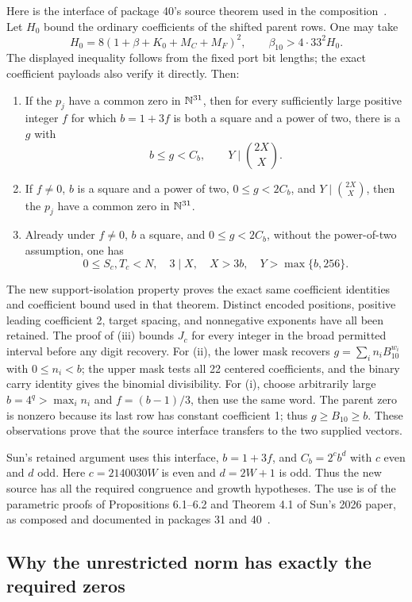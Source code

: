 Here is the interface of package 40's source theorem used in the
composition~\cite{source40}.  Let $H_0$ bound the ordinary coefficients
of the shifted parent rows.  One may take
\[
 H_0=8(1+\beta+K_0+M_C+M_F)^2,
 \qquad \beta_{10}>4\cdot33^2H_0.
\]
The displayed inequality follows from the fixed port bit lengths; the
exact coefficient payloads also verify it directly.  Then:
\begin{enumerate}[label=\textup{(\roman*)}]
\item If the $p_j$ have a common zero in $\mathbb N^{31}$, then for every
sufficiently large positive integer $f$ for which $b=1+3f$ is both a
square and a power of two, there is a $g$ with
\[
 b\leq g<C_b,\qquad Y\mid\binom{2X}{X}.
\]
\item If $f\ne0$, $b$ is a square and a power of two,
$0\leq g<2C_b$, and $Y\mid\binom{2X}{X}$, then the $p_j$ have a
common zero in $\mathbb N^{31}$.
\item Already under $f\ne0$, $b$ a square, and $0\leq g<2C_b$,
without the power-of-two assumption, one has
\[
 0\leq S_c,T_c<N,\quad3\mid X,\quad X>3b,\quad
 Y>\max\{b,256\}.
\]
\end{enumerate}

The new support-isolation property proves the exact same coefficient
identities and coefficient bound used in that theorem.  Distinct
encoded positions, positive leading coefficient 2, target spacing,
and nonnegative exponents have all been retained.  The proof of
\textup{(iii)} bounds $J_c$ for every integer in the broad permitted
interval before any digit recovery.  For \textup{(ii)}, the lower mask
recovers $g=\sum_i n_iB_{10}^{w_i}$ with $0\leq n_i<b$; the upper mask
tests all 22 centered coefficients, and the binary carry identity gives
the binomial divisibility.  For \textup{(i)}, choose arbitrarily large
$b=4^q>\max_i n_i$ and $f=(b-1)/3$, then use the same word.  The parent
zero is nonzero because its last row has constant coefficient 1; thus
$g\geq B_{10}\geq b$.  These observations prove that the source
interface transfers to the two supplied vectors.

Sun's retained argument uses this interface, $b=1+3f$, and
$C_b=2^c b^d$ with $c$ even and $d$ odd.  Here
$c=2140030W$ is even and $d=2W+1$ is odd.  Thus the new source has all
the required congruence and growth hypotheses.  The use is of the
parametric proofs of Propositions 6.1--6.2 and Theorem 4.1 of
Sun's 2026 paper, as composed and documented in packages 31 and
40~\cite{sun2026,source31,source40}.

\subsection{Why the unrestricted norm has exactly the required zeros}

